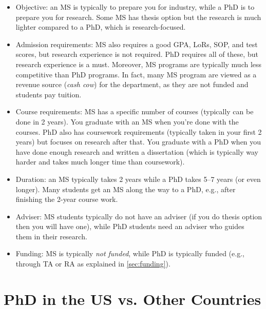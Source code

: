 \documentclass[oneside,11pt,dvipsnames]{book}
\begin{document}
\begin{itemize}

  \item Objective: an MS is typically to prepare you for industry, while a PhD is to prepare you for research. Some MS has thesis option but the research is much lighter compared to a PhD, which is research-focused.

  \item Admission requirements: MS also requires a good GPA, LoRs, SOP, and test scores, but research experience is not required.  PhD requires all of these, but research experience is a must. Moreover, MS programs are typically much less competitive than PhD programs. In fact, many MS program are viewed as a revenue source (\emph{cash cow}) for the department, as they are not funded and students pay tuition.
  
  \item Course requirements: MS has a specific number of courses (typically can be done in 2 years). You graduate with an MS when you're done with the courses. PhD also has coursework requirements (typically taken in your first 2 years) but focuses on research after that.  You graduate with a PhD when you have done enough research and written a dissertation (which is typically way harder and takes much longer time than coursework).
  
  \item Duration: an MS typically takes 2 years while a PhD takes 5--7 years (or even longer).  Many students get an MS along the way to a PhD, e.g., after finishing the 2-year course work.
  
  \item Adviser: MS students typically do not have an adviser (if you do thesis option then you will have one), while PhD students need an adviser who guides them in their research.
  
  \item Funding: MS is typically \emph{not funded}, while PhD is typically funded (e.g., through TA or RA as explained in \autoref{sec:funding}).
  
\end{itemize}


\section{PhD in the US vs. Other Countries}\label{sec:non-us-differences}
\end{document}
